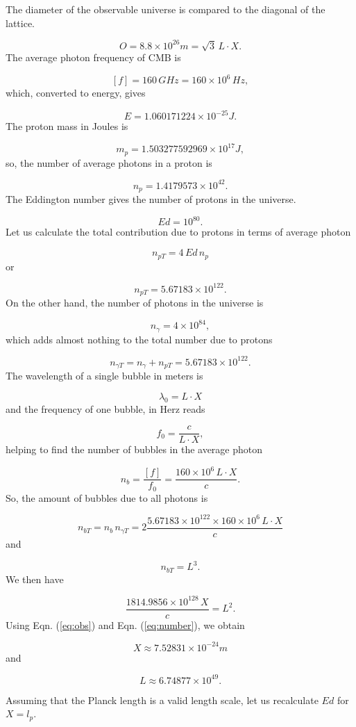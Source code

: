 \documentclass[12pt,english]{article}
\begin{document}
The diameter of the observable universe \cite{halpbern} is compared
to the diagonal of the lattice.

\begin{equation}
O=8.8\times10^{26}m=\sqrt{3}\,L\cdot X.\label{eq:obs}
\end{equation}
The average photon frequency of CMB \cite{archeops} is

\[
[f]=160\,GHz=160\times10^{6}\,Hz,
\]
which, converted to energy, gives

\[
E=1.060171224\times10^{-25}J.
\]
The proton mass in Joules is

\[
m_{p}=1.503277592969\times10^{17}J,
\]
so, the number of average photons in a proton is

\[
n_{p}=1.4179573\times10^{42}.
\]
The Eddington number gives the number of protons in the universe.

\[
Ed=10^{80}.
\]
Let us calculate the total contribution due to protons in terms of
average photon

\[
n_{pT}=4\,Ed\,n_{p}
\]
or

\[
n_{pT}=5.67183\times10^{122}.
\]
On the other hand, the number of photons in the universe is

\[
n_{\gamma}=4\times10^{84},
\]
which adds almost nothing to the total number due to protons

\[
n_{\gamma T}=n_{\gamma}+n_{pT}=5.67183\times10^{122}.
\]
The wavelength of a single bubble in meters is

\[
\lambda_{0}=L\cdot X
\]
and the frequency of one bubble, in Herz reads

\[
f_{0}=\frac{c}{L\cdot X},
\]
helping to find the number of bubbles in the average photon

\[
n_{b}=\frac{[f]}{f_{0}}=\frac{160\times10^{6}\,L\cdot X}{c}.
\]
So, the amount of bubbles due to all photons is

\[
n_{bT}=n_{b}\,n_{\gamma T}=2\frac{5.67183\times10^{122}\times160\times10^{6}\,L\cdot X}{c}
\]
and

\[
n_{bT}=L^{3}.
\]
We then have

\begin{equation}
\frac{1814.9856\times10^{128}\,X}{c}=L^{2}.\label{eq:number}
\end{equation}
Using Eqn. (\ref{eq:obs}) and Eqn. (\ref{eq:number}), we obtain 

\[
X\approx7.52831\times10^{-24}m
\]
and

\[
L\approx6.74877\times10^{49}.
\]

Assuming that the Planck length is a valid length scale, let us recalculate
$Ed$ for $X=l_{p}$.
\end{document}

